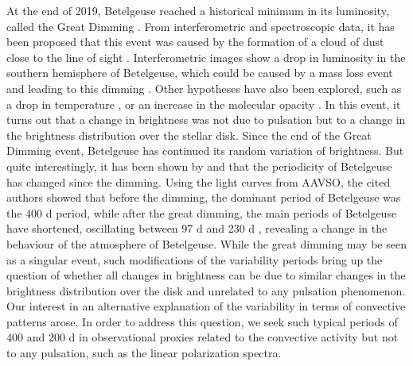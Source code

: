 \documentclass{aa}
\begin{document}
At the end of 2019, Betelgeuse reached a historical minimum in its luminosity, called the Great Dimming \citep{guinan_fall_2020}. 
From interferometric and spectroscopic data, it has been proposed that this event was caused by the formation of a cloud of dust close to the line of sight \citep{montarges_dusty_2021}. 
Interferometric images show a drop in luminosity in the southern hemisphere of Betelgeuse, which could be caused by a mass loss event and leading to this dimming \citep{dupree_great_2022}. Other hypotheses have also been explored, such as a drop in temperature \citep{harper_photospheric_2020}, or an increase in the molecular opacity \citep{kravchenko_atmosphere_2021}. In this event, it turns out that a change in brightness was not due to pulsation but to a change in the 
brightness distribution over the stellar disk.
Since the end of the Great Dimming event, Betelgeuse has continued its random variation of brightness. 
But quite interestingly, 
it has been shown by \cite{jadlovsky_analysis_2023} and \cite{dupree_great_2022} that the periodicity of Betelgeuse has changed since the dimming. Using the light curves from AAVSO, 
the cited authors showed that before the dimming, the dominant period of Betelgeuse was the 400 d period, while after the great dimming, the main periods of Betelgeuse have shortened, oscillating between 97 d and 230 d \citep{dupree_great_2022}, revealing a change in the behaviour of the atmosphere of Betelgeuse.
While the great dimming may be seen as 
a singular event, such modifications of the variability periods bring up the question of whether all changes in brightness can be due to similar changes in the brightness 
distribution over the disk and unrelated to any pulsation phenomenon. 
Our interest in an alternative explanation of the variability
in terms  of convective patterns arose. In order to address this question, we seek such typical periods of 400 and 200 d in  
observational proxies related to the convective
activity but not to any pulsation, such as the linear polarization
spectra.\\
\end{document}
